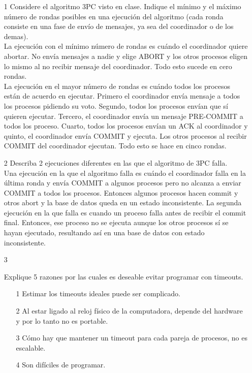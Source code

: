 \documentclass[12pt,a4paper]{report}
\begin{document}
\begin{itemize}
\item[1]{Considere el algoritmo 3PC visto en clase. Indique el mínimo y el
    máximo número de rondas posibles en una ejecución del algoritmo (cada
    ronda consiste en una fase de envío de mensajes, ya sea del
    coordinador o de los demas).\\
    La ejecución con el mínimo número de rondas es cuándo el coordinador quiere
    abortar. No envía mensajes a nadie y elige ABORT y los otros procesos eligen
    lo mismo al no recibir mensaje del coordinador. Todo esto sucede en cero
    rondas.\\
    La ejecución en el mayor número de rondas es cuándo todos los procesos
    están de acuerdo en ejecutar. Primero el coordinador envía mensaje a todos
    los procesos pidiendo su voto. Segundo, todos los procesos envían que sí
    quieren ejecutar. Tercero, el coordinador envía un mensaje PRE-COMMIT a
    todos los proceso. Cuarto, todos los procesos envían un ACK al coordinador
    y quinto, el coordinador envía COMMIT y ejecuta. Los otros procesos al
    recibir COMMIT del coordinador ejecutan. Todo esto se hace en cinco rondas.
}
\item[2]{Describa 2 ejecuciones diferentes en las que el algoritmo de 3PC
    falla.\\
    Una ejecución en la que el algoritmo falla es cuándo el coordinador falla
    en la última ronda y envía COMMIT a algunos procesos pero no alcanza a
    enviar COMMIT a todos los procesos. Entonces algunos procesos hacen commit y
    otros abort y la base de datos queda en un estado inconsistente.
    La segunda ejecución en la que falla es cuando un proceso falla antes de
    recibir el commit final. Entonces, ese proceso no se ejecuta aunque los
    otros procesos sí se hayan ejecutado, resultando así en una base de datos
    con estado inconsistente.
}
\item[3]{Explique 5 razones por las cuales es deseable evitar programar con
    timeouts.
    \begin{itemize}
        \item[1]{Estimar los timeouts ideales puede ser complicado.}
        \item[2]{Al estar ligado al reloj físico de la computadora, depende del
            hardware y por lo tanto no es portable.}
        \item[3]{Cómo hay que mantener un timeout para cada pareja de procesos,
            no es escalable.}
        \item[4]{Son difíciles de programar.}

\end{itemize}}
\end{itemize}
\end{document}
